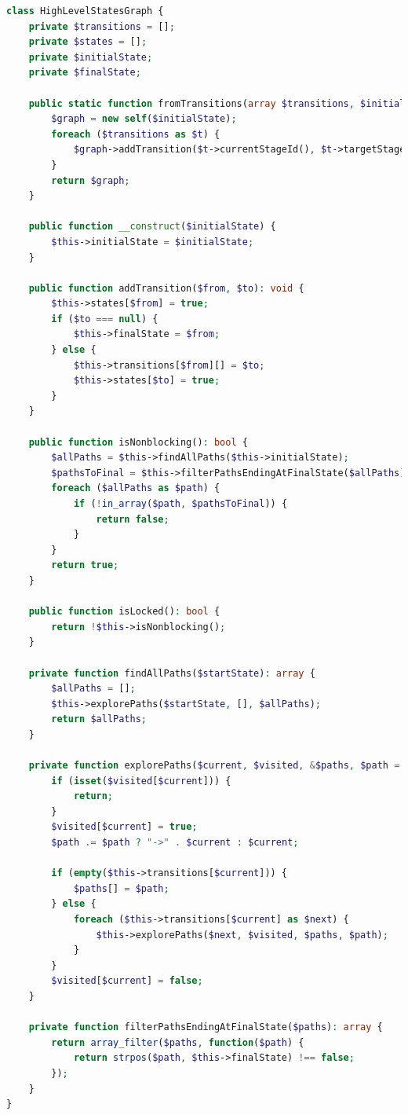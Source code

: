 \begin{lstlisting}[language=php, caption={Class to prevent blocking states.}, basicstyle=\tiny, label=lst:HighLevelStatesGraph]
class HighLevelStatesGraph {
    private $transitions = [];
    private $states = [];
    private $initialState;
    private $finalState;

    public static function fromTransitions(array $transitions, $initialState): self {
        $graph = new self($initialState);
        foreach ($transitions as $t) {
            $graph->addTransition($t->currentStageId(), $t->targetStageId());
        }
        return $graph;
    }

    public function __construct($initialState) {
        $this->initialState = $initialState;
    }

    public function addTransition($from, $to): void {
        $this->states[$from] = true;
        if ($to === null) {
            $this->finalState = $from;
        } else {
            $this->transitions[$from][] = $to;
            $this->states[$to] = true;
        }
    }

    public function isNonblocking(): bool {
        $allPaths = $this->findAllPaths($this->initialState);
        $pathsToFinal = $this->filterPathsEndingAtFinalState($allPaths);
        foreach ($allPaths as $path) {
            if (!in_array($path, $pathsToFinal)) {
                return false;
            }
        }
        return true;
    }

    public function isLocked(): bool {
        return !$this->isNonblocking();
    }

    private function findAllPaths($startState): array {
        $allPaths = [];
        $this->explorePaths($startState, [], $allPaths);
        return $allPaths;
    }

    private function explorePaths($current, $visited, &$paths, $path = ''): void {
        if (isset($visited[$current])) {
            return;
        }
        $visited[$current] = true;
        $path .= $path ? "->" . $current : $current;

        if (empty($this->transitions[$current])) {
            $paths[] = $path;
        } else {
            foreach ($this->transitions[$current] as $next) {
                $this->explorePaths($next, $visited, $paths, $path);
            }
        }
        $visited[$current] = false;
    }

    private function filterPathsEndingAtFinalState($paths): array {
        return array_filter($paths, function($path) {
            return strpos($path, $this->finalState) !== false;
        });
    }
}
\end{lstlisting}


